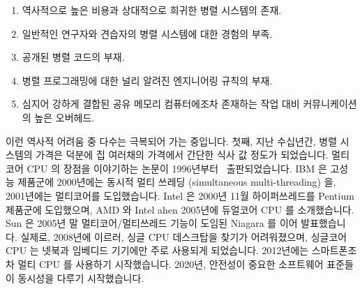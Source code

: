 \fi

\begin{enumerate}
\item	역사적으로 높은 비용과 상대적으로 희귀한 병렬 시스템의 존재.
\item	일반적인 연구자와 견습자의 병렬 시스템에 대한 경험의 부족.
\item	공개된 병렬 코드의 부재.
\item	병렬 프로그래밍에 대한 널리 알려진 엔지니어링 규칙의 부재.
\item	심지어 강하게 결합된 공유 메모리 컴퓨터에조차 존재하는 작업 대비
	커뮤니케이션의 높은 오버헤드.

\end{enumerate}

이런 역사적 어려움 중 다수는 극복되어 가는 중입니다.
첫째, 지난 수십년간, 병렬 시스템의 가격은  덕분에 집 여러채의
가격에서 간단한 식사 값 정도가 되었습니다.
멀티코어 CPU 의 장점을 이야기하는 논문이 1996년부터~\cite{Olukotun96}
출판되었습니다.
IBM 은 고성능 \Power{} 제품군에 2000년에는 동시적 멀티 쓰레딩 (simultaneous
multi-threading) 을, 2001년에는 멀티코어를 도입했습니다.
Intel 은 2000년 11월 하이퍼쓰레드를 Pentium 제품군에 도입했으며, AMD 와 Intel
ahen 2005년에 듀얼코어 CPU 를 소개했습니다.
Sun 은 2005년 말 멀티코어/멀티쓰레드 기능이 도임된 Niagara 를 이어
발표했습니다.
실제로, 2008년에 이르러, 싱글 CPU 데스크탑을 찾기가 어려워졌으며, 싱글코어 CPU
는 넷북과 임베디드 기기에만 주로 사용되게 되었습니다.
2012년에는 스마트폰조차 멀티 CPU 를 사용하기 시작했습니다.
2020년, 안전성이 중요한 소프트웨어 표준들이 동시성을 다루기 시작했습니다.

\iffalse

